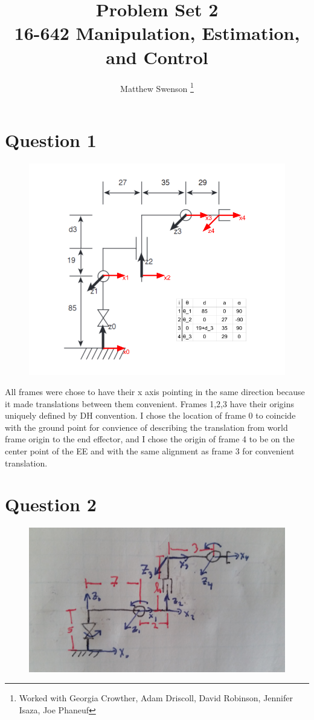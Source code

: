\documentclass[11pt]{article}
\title{Problem Set 2\\ \vspace{2mm}\Large{16-642 Manipulation, Estimation, and Control}}
\author{Matthew Swenson \thanks{Worked with Georgia Crowther, Adam Driscoll, David Robinson, Jennifer Isaza, Joe Phaneuf}}
\begin{document}
	\maketitle
    
	
\section*{Question 1}
\begin{figure}[H]
    \centering
    \includegraphics[width=.7\textwidth]{q1.png}
\end{figure}
All frames were chose to have their x axis pointing in the same direction because it made
translations between them convenient. 
Frames 1,2,3 have their origins uniquely defined by DH convention. I chose the location of frame 0
to coincide with the ground point for convience of describing the translation from world frame origin
to the end effector, and I chose the origin of frame 4 to be on the center point of the EE and with 
the same alignment as frame 3 for convenient translation.
\section*{Question 2}
\begin{figure}[H]
    \includegraphics[width=\textwidth]{q2.jpg}
\end{figure}
\end{document}

